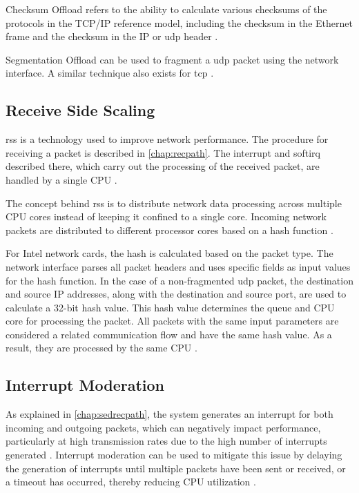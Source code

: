 Checksum Offload refers to the ability to calculate various checksums of the protocols in the TCP/IP reference model, including the checksum in the Ethernet frame and the checksum in the IP or \ac{udp} header \cite{tuning02}.

Segmentation Offload can be used to fragment a \ac{udp} packet using the network interface. A similar technique also exists for \ac{tcp} \cite{tuning03}.


\subsection{Receive Side Scaling} \label{chap:ReceiveSideScaling}
\ac{rss} is a technology used to improve network performance. The procedure for receiving a packet is described in \ref{chap:recpath}. The interrupt and softirq described there, which carry out the processing of the received packet, are handled by a single \ac{CPU} \cite{rss01}.

The concept behind \ac{rss} is to distribute network data processing across multiple \ac{CPU} cores instead of keeping it confined to a single core. Incoming network packets are distributed to different processor cores based on a hash function \cite{rss02}.

For Intel network cards, the hash is calculated based on the packet type. The network interface parses all packet headers and uses specific fields as input values for the hash function. In the case of a non-fragmented \ac{udp} packet, the destination and source IP addresses, along with the destination and source port, are used to calculate a 32-bit hash value. This hash value determines the queue and \ac{CPU} core for processing the packet. All packets with the same input parameters are considered a related communication flow and have the same hash value. As a result, they are processed by the same \ac{CPU} \cite{rss03}.

\subsection{Interrupt Moderation} \label{chap:InterMod}
As explained in \ref{chap:sedrecpath}, the system generates an interrupt for both incoming and outgoing packets, which can negatively impact performance, particularly at high transmission rates due to the high number of interrupts generated \cite{intermod01}. Interrupt moderation can be used to mitigate this issue by delaying the generation of interrupts until multiple packets have been sent or received, or a timeout has occurred, thereby reducing \ac{CPU} utilization \cite{intermod02}.

